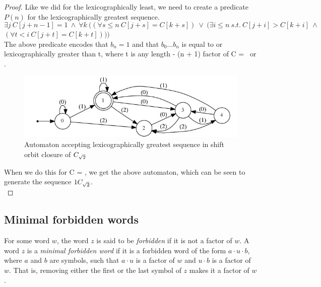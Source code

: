 \begin{proof}
Like we did for the lexicographically least, we need to create a predicate $P(n)$ for the lexicographically greatest sequence. 
\begin{equation*}
    \exists j\ C[j+n-1]=1\ \wedge\ \forall k\ ((\forall s \leq n\ C[j+s]=C[k+s])\ \vee \ (\exists i \leq n\ s.t.\ C[j+i] > C[k+i]\ \wedge
\end{equation*} 
$(\forall t < i\ C[j+t]=C[k+t])))$ \newline \\
The above predicate encodes that $b_{n}=1$ and that $b_{0}...b_{n}$ is equal to or lexicographically greater than t, where t is any length - (n + 1) factor of C = \Ctwo\ or \Cthree.\\  \newline
\begin{figure}[h]
    \centering
    \includegraphics[width=\textwidth]{sturmian_word_paper/paper_images/theorem29greatest.png}
    \caption{Automaton accepting lexicographically greatest sequence in shift orbit closure of $C_{\sqrt{2}}$}
\end{figure} \newline
When we do this for C = \Ctwo, we get the above automaton, which can be seen to generate the sequence $1C_{\sqrt{2}}$. \\
\end{proof}


\subsection{Minimal forbidden words}


For some word $w$, the word $z$ is said to be \textit{forbidden} if it is not a factor of $w$.
A word $z$ is a \textit{minimal forbidden word} if it is a forbidden word of the form $a \cdot u \cdot b$, where $a$ and $b$ are symbols, such that $a \cdot u$ is a factor of $w$ and $u \cdot b$ is a factor of $w$.
That is, removing either the first or the last symbol of $z$ makes it a factor of $w$.

